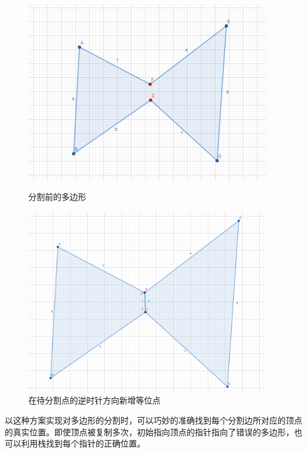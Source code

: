 \begin{figure}[htbp]
    \centering
    \begin{minipage}{0.4\textwidth}
        \centering
        \includegraphics[width=0.95\textwidth]
        {figures/cut1.png}
        \caption{分割前的多边形}
    \end{minipage}
    \begin{minipage}{0.4\textwidth}
        \centering
        \includegraphics[width=0.95\textwidth]
        {figures/cut2.png}
        \caption{在待分割点的逆时针方向新增等位点}
    \end{minipage}
\end{figure}

以这种方案实现对多边形的分割时，可以巧妙的准确找到每个分割边所对应的顶点的真实位置。即使顶点被复制多次，初始指向顶点的指针指向了错误的多边形，也可以利用栈找到每个指针的正确位置。

